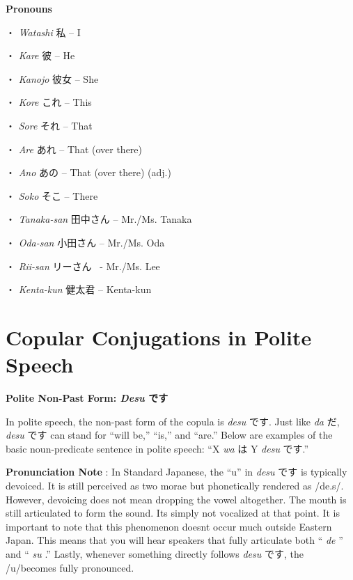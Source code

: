 \par{\textbf{Pronouns }}

\par{・ \emph{Watashi }私 – I }

\par{・ \emph{Kare }彼 – He }

\par{・ \emph{Kanojo }彼女 – She }

\par{・ \emph{Kore }これ – This }

\par{・ \emph{Sore }それ – That }

\par{・ \emph{Are }あれ – That (over there) }

\par{・ \emph{Ano }あの – That (over there) (adj.) }

\par{・ \emph{Soko }そこ – There }

\par{・ \emph{Tanaka-san }田中さん – Mr.\slash Ms. Tanaka }

\par{・ \emph{Oda-san }小田さん – Mr.\slash Ms. Oda }

\par{・ \emph{Rii-san }リーさん  - Mr.\slash Ms. Lee }

\par{・ \emph{Kenta-kun }健太君 – Kenta-kun }
      
\section{Copular Conjugations in Polite Speech}
 
\begin{center}
\textbf{Polite Non-Past Form: \emph{Desu }です }
\end{center}

\par{ In polite speech, the non-past form of the copula is \emph{desu }です. Just like \emph{da }だ, \emph{desu }です can stand for “will be,” “is,” and “are.” Below are examples of the basic noun-predicate sentence in polite speech: “X \emph{wa }は Y \emph{desu }です.” }

\par{\textbf{Pronunciation Note }: In Standard Japanese, the “u” in \emph{desu }です is typically devoiced. It is still perceived as two morae but phonetically rendered as \slash de.s\slash . However, devoicing does not mean dropping the vowel altogether. The mouth is still articulated to form the sound. It\textquotesingle s simply not vocalized at that point. It is important to note that this phenomenon doesn\textquotesingle t occur much outside Eastern Japan. This means that you will hear speakers that fully articulate both “ \emph{de }” and “ \emph{su }.” Lastly, whenever something directly follows \emph{desu }です, the \slash u\slash  becomes fully pronounced. }

